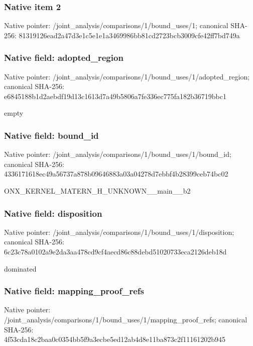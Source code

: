 \documentclass[10pt,a4paper]{article}
\begin{document}
\subsubsection{Native item 2}
Native pointer: /joint\_\allowbreak{}analysis/comparisons/1/bound\_\allowbreak{}uses/1; canonical SHA-256: 81319126ead2a47d3e1c5e1e1a3469986bb81cd2723bcb3009cfe42ff7bd749a

\subsubsection{Native field: adopted\_\allowbreak{}region}
Native pointer: /joint\_\allowbreak{}analysis/comparisons/1/bound\_\allowbreak{}uses/1/adopted\_\allowbreak{}region; canonical SHA-256: e6845188b1d2aebdf19d13c1613d7a49b5806a7fe336ec775fa182b36719bbc1

\begingroup\raggedright\sloppy empty\par\endgroup

\subsubsection{Native field: bound\_\allowbreak{}id}
Native pointer: /joint\_\allowbreak{}analysis/comparisons/1/bound\_\allowbreak{}uses/1/bound\_\allowbreak{}id; canonical SHA-256: 4336171618ec49a56737a878b09646883a03a04278d7ebbf4b28399ceb74bc02

\begingroup\raggedright\sloppy ONX\_\allowbreak{}KERNEL\_\allowbreak{}MATERN\_\allowbreak{}H\_\allowbreak{}UNKNOWN\_\allowbreak{}\_\allowbreak{}main\_\allowbreak{}\_\allowbreak{}b2\par\endgroup

\subsubsection{Native field: disposition}
Native pointer: /joint\_\allowbreak{}analysis/comparisons/1/bound\_\allowbreak{}uses/1/disposition; canonical SHA-256: 6c23c78a0102a9e2da3aa478cd9cf4aecd86c88debd51020733eca2126deb18d

\begingroup\raggedright\sloppy dominated\par\endgroup

\subsubsection{Native field: mapping\_\allowbreak{}proof\_\allowbreak{}refs}
Native pointer: /joint\_\allowbreak{}analysis/comparisons/1/bound\_\allowbreak{}uses/1/mapping\_\allowbreak{}proof\_\allowbreak{}refs; canonical SHA-256: 4f53cda18c2baa0c0354bb5f9a3ecbe5ed12ab4d8e11ba873c2f11161202b945
\end{document}
